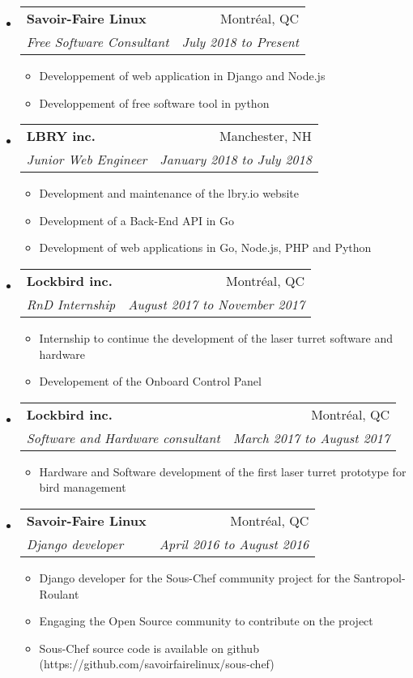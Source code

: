 \documentclass[letterpaper,11pt]{article}
\makeatletter
\newcommand{\ressubheading}[4]{
	\begin{tabular*}{6.5in}{l@{\cftdotfill{\cftsecdotsep}\extracolsep{\fill}}r}
		\textbf{#1} & #2 \\
		\textit{#3} & \textit{#4} \\
	\end{tabular*}\vspace{-6pt}}
\makeatother
\begin{document}
	\begin{itemize}
		
		\item
			\ressubheading{Savoir-Faire Linux}{Montréal, QC}{Free Software Consultant}{July 2018 to Present}
			
			\begin{itemize}
				\item Developpement of web application in Django and Node.js 
				\item Developpement of free software tool in python
			\end{itemize}
		
		\item
			\ressubheading{LBRY inc.}{Manchester, NH}{Junior Web Engineer}{January 2018 to July 2018}
			
			\begin{itemize}
				\item Development and maintenance of the lbry.io website
				\item Development of a Back-End API in Go
				\item Development of web applications in Go, Node.js, PHP and Python
			\end{itemize}
		
		\item 
			\ressubheading{Lockbird inc.}{Montréal, QC}{RnD Internship}{August 2017 to November 2017}
			
			\begin{itemize}
				\item Internship to continue the development of the laser turret software and hardware
				\item  Developement of the Onboard Control Panel
			\end{itemize}
			
		\item
			\ressubheading{Lockbird inc.}{Montréal, QC}{Software and Hardware consultant}{March 2017 to August 2017}
			
			\begin{itemize}
				\item Hardware and Software development of the first laser turret prototype for bird management
			\end{itemize}
			
		\item
			\ressubheading{Savoir-Faire Linux}{Montréal, QC}{Django developer}{April 2016 to August 2016}
			
			\begin{itemize}
				\item Django developer for the Sous-Chef community project for the Santropol-Roulant
				\item Engaging the Open Source community to contribute on the project
				\item Sous-Chef source code is available on github (https://github.com/savoirfairelinux/sous-chef)
			\end{itemize}
			

\end{itemize}
\end{document}

